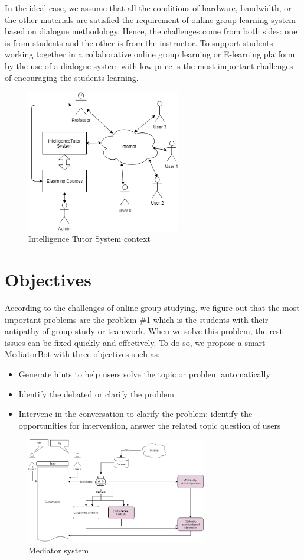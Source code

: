 \documentclass[letterpaper%
, twoside%
, 12pt%
,these%
, english%
,creativecommons,hyperref, withAlgo2e %
]{thETS}
\begin{document}
In the ideal case, we assume that all the conditions of hardware, bandwidth, or the other materials are satisfied the requirement of online group learning system based on dialogue methodology. Hence, the challenges come from both sides: one is from students and the other is from the instructor. To support students working together in a collaborative online group learning or E-learning platform by the use of a dialogue system with low price is the most important challenges of encouraging the students learning.

\begin{figure}
	\includegraphics[width=0.6\textwidth]{Figures/se1.png}
	\caption{Intelligence Tutor System context}
	\label{ITSC}
\end{figure}
\section{Objectives}
According to the challenges of online group studying, we figure out that the most important problems are the problem \#1 which is the students with their antipathy of group study or teamwork. When we solve this problem, the rest issues can be fixed quickly and effectively. To do so, we propose a smart MediatorBot with three objectives such as: 
\begin{itemize}
	\item Generate hints to help users solve the topic or problem automatically
	\item    Identify the debated or clarify the problem
	\item Intervene in the conversation to clarify the problem: identify the opportunities for intervention, answer the related topic question of users
\end{itemize}
\begin{figure}
	\includegraphics[width=0.7\textwidth]{Figures/2.png}
	\caption{Mediator system}
	\label{MS}
\end{figure}
\end{document}
